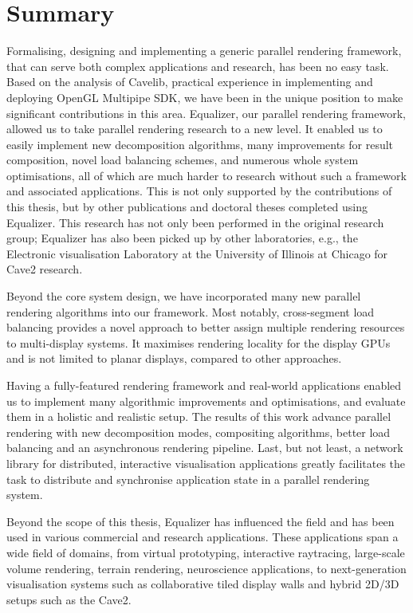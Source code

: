 \section{Summary}

Formalising, designing and implementing a generic parallel rendering framework,
that can serve both complex applications and research, has been no easy task.
Based on the analysis of Cavelib, practical experience in implementing and
deploying OpenGL Multipipe SDK, we have been in the unique position to make
significant contributions in this area. Equalizer, our parallel rendering
framework, allowed us to take parallel rendering research to a new level. It
enabled us to easily implement new decomposition algorithms, many
improvements for result composition, novel load balancing schemes, and numerous
whole system optimisations, all of which are much harder to research without such a
framework and associated applications. This is not only supported by the
contributions of this thesis, but by other publications and doctoral theses
completed using Equalizer. This research has not only been performed in the
original research group; Equalizer has also been picked up by other
laboratories, e.g., the Electronic visualisation Laboratory at the University
of Illinois at Chicago for Cave2 research.

Beyond the core system design, we have incorporated many new parallel rendering
algorithms into our framework. Most notably, cross-segment load balancing
provides a novel approach to better assign multiple rendering resources to
multi-display systems. It maximises rendering locality for the display GPUs and
is not limited to planar displays, compared to other approaches.

Having a fully-featured rendering framework and real-world applications enabled
us to implement many algorithmic improvements and optimisations, and evaluate
them in a holistic and realistic setup. The results of this work advance
parallel rendering with new decomposition modes, compositing algorithms, better
load balancing and an asynchronous rendering pipeline. Last, but not least, a
network library for distributed, interactive visualisation applications greatly
facilitates the task to distribute and synchronise application state in a
parallel rendering system.

Beyond the scope of this thesis, Equalizer has influenced the field and has
been used in various commercial and research applications. These applications
span a wide field of domains, from virtual prototyping, interactive raytracing,
large-scale volume rendering, terrain rendering, neuroscience applications, to
next-generation visualisation systems such as collaborative tiled display walls
and hybrid 2D/3D setups such as the Cave2.

